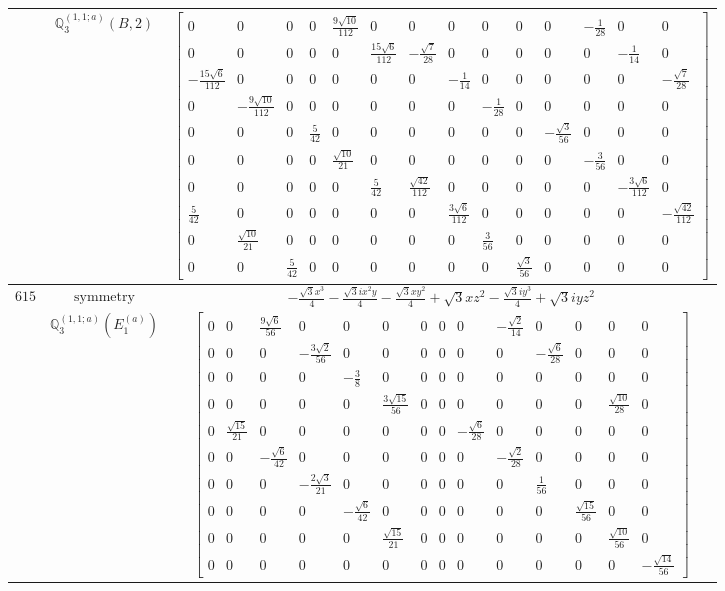\documentclass[fleqn,8pt,landscape]{jsarticle}
\begin{document}
\begin{longtable}{ccc}
$  $ & $ \mathbb{Q}_{3}^{(1,1;a)}(B,2) $ & $ \begin{bmatrix} 0 & 0 & 0 & 0 & \frac{9 \sqrt{10}}{112} & 0 & 0 & 0 & 0 & 0 & 0 & - \frac{1}{28} & 0 & 0 \\ 0 & 0 & 0 & 0 & 0 & \frac{15 \sqrt{6}}{112} & - \frac{\sqrt{7}}{28} & 0 & 0 & 0 & 0 & 0 & - \frac{1}{14} & 0 \\ - \frac{15 \sqrt{6}}{112} & 0 & 0 & 0 & 0 & 0 & 0 & - \frac{1}{14} & 0 & 0 & 0 & 0 & 0 & - \frac{\sqrt{7}}{28} \\ 0 & - \frac{9 \sqrt{10}}{112} & 0 & 0 & 0 & 0 & 0 & 0 & - \frac{1}{28} & 0 & 0 & 0 & 0 & 0 \\ 0 & 0 & 0 & \frac{5}{42} & 0 & 0 & 0 & 0 & 0 & 0 & - \frac{\sqrt{3}}{56} & 0 & 0 & 0 \\ 0 & 0 & 0 & 0 & \frac{\sqrt{10}}{21} & 0 & 0 & 0 & 0 & 0 & 0 & - \frac{3}{56} & 0 & 0 \\ 0 & 0 & 0 & 0 & 0 & \frac{5}{42} & \frac{\sqrt{42}}{112} & 0 & 0 & 0 & 0 & 0 & - \frac{3 \sqrt{6}}{112} & 0 \\ \frac{5}{42} & 0 & 0 & 0 & 0 & 0 & 0 & \frac{3 \sqrt{6}}{112} & 0 & 0 & 0 & 0 & 0 & - \frac{\sqrt{42}}{112} \\ 0 & \frac{\sqrt{10}}{21} & 0 & 0 & 0 & 0 & 0 & 0 & \frac{3}{56} & 0 & 0 & 0 & 0 & 0 \\ 0 & 0 & \frac{5}{42} & 0 & 0 & 0 & 0 & 0 & 0 & \frac{\sqrt{3}}{56} & 0 & 0 & 0 & 0 \end{bmatrix} $ \\ \hline
$ 615 $ & $ \text{symmetry} $ & $ - \frac{\sqrt{3} x^{3}}{4} - \frac{\sqrt{3} i x^{2} y}{4} - \frac{\sqrt{3} x y^{2}}{4} + \sqrt{3} x z^{2} - \frac{\sqrt{3} i y^{3}}{4} + \sqrt{3} i y z^{2} $ \\
$  $ & $ \mathbb{Q}_{3}^{(1,1;a)}(E_{1}^{(a)}) $ & $ \begin{bmatrix} 0 & 0 & \frac{9 \sqrt{6}}{56} & 0 & 0 & 0 & 0 & 0 & 0 & - \frac{\sqrt{2}}{14} & 0 & 0 & 0 & 0 \\ 0 & 0 & 0 & - \frac{3 \sqrt{2}}{56} & 0 & 0 & 0 & 0 & 0 & 0 & - \frac{\sqrt{6}}{28} & 0 & 0 & 0 \\ 0 & 0 & 0 & 0 & - \frac{3}{8} & 0 & 0 & 0 & 0 & 0 & 0 & 0 & 0 & 0 \\ 0 & 0 & 0 & 0 & 0 & \frac{3 \sqrt{15}}{56} & 0 & 0 & 0 & 0 & 0 & 0 & \frac{\sqrt{10}}{28} & 0 \\ 0 & \frac{\sqrt{15}}{21} & 0 & 0 & 0 & 0 & 0 & 0 & - \frac{\sqrt{6}}{28} & 0 & 0 & 0 & 0 & 0 \\ 0 & 0 & - \frac{\sqrt{6}}{42} & 0 & 0 & 0 & 0 & 0 & 0 & - \frac{\sqrt{2}}{28} & 0 & 0 & 0 & 0 \\ 0 & 0 & 0 & - \frac{2 \sqrt{3}}{21} & 0 & 0 & 0 & 0 & 0 & 0 & \frac{1}{56} & 0 & 0 & 0 \\ 0 & 0 & 0 & 0 & - \frac{\sqrt{6}}{42} & 0 & 0 & 0 & 0 & 0 & 0 & \frac{\sqrt{15}}{56} & 0 & 0 \\ 0 & 0 & 0 & 0 & 0 & \frac{\sqrt{15}}{21} & 0 & 0 & 0 & 0 & 0 & 0 & \frac{\sqrt{10}}{56} & 0 \\ 0 & 0 & 0 & 0 & 0 & 0 & 0 & 0 & 0 & 0 & 0 & 0 & 0 & - \frac{\sqrt{14}}{56} \end{bmatrix} $ \\ \hline

\end{longtable}
\end{document}
